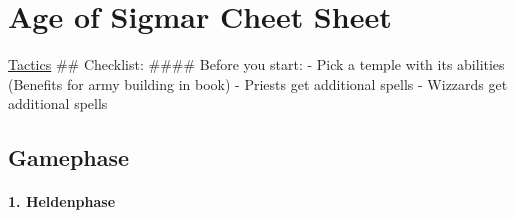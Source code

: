 \hypertarget{age-of-sigmar-cheet-sheet}{%
\section{Age of Sigmar Cheet Sheet}\label{age-of-sigmar-cheet-sheet}}

\href{https://1d4chan.org/wiki/Age_of_Sigmar/Tactics/Order/Daughters_of_Khaine}{Tactics}
\#\# Checklist: \#\#\#\# Before you start: - Pick a temple with its
abilities (Benefits for army building in book) - Priests get additional
spells - Wizzards get additional spells

\hypertarget{gamephase}{%
\subsection{Gamephase}\label{gamephase}}

\hypertarget{heldenphase}{%
\paragraph{1. Heldenphase}\label{heldenphase}}

